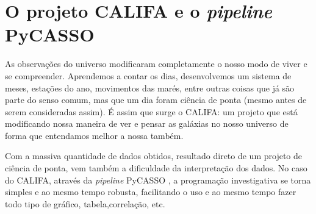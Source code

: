 


\chapter{O projeto CALIFA e o {\em pipeline} PyCASSO}
\label{sec:CALePyC}

As observações do universo modificaram completamente o nosso modo de viver e se
compreender. Aprendemos a contar os dias, desenvolvemos um sistema de meses,
estações do ano, movimentos das marés, entre outras coisas que já são parte do
senso comum, mas que um dia foram ciência de ponta (mesmo antes de serem
consideradas assim). É assim que surge o CALIFA: um projeto que está
modificando nossa maneira de ver e pensar as galáxias no nosso universo de
forma que entendamos melhor a nossa também.

Com a massiva quantidade de dados obtidos, resultado direto de um projeto de
ciência de ponta, vem também a dificuldade da interpretação dos dados. No caso
do CALIFA, através da {\em pipeline} PyCASSO \citep{CidFernandes2013a}, a
programação investigativa se torna simples e ao mesmo tempo robusta,
facilitando o uso e ao mesmo tempo fazer todo tipo de gráfico,
tabela,correlação, etc.


